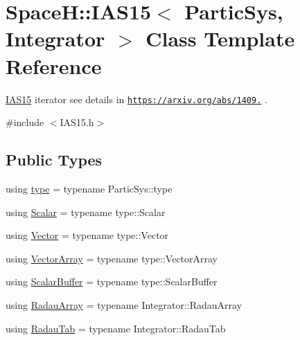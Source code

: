\hypertarget{class_space_h_1_1_i_a_s15}{}\section{SpaceH\+:\+:I\+A\+S15$<$ Partic\+Sys, Integrator $>$ Class Template Reference}
\label{class_space_h_1_1_i_a_s15}


\mbox{\hyperlink{class_space_h_1_1_i_a_s15}{I\+A\+S15}} iterator see details in \href{https://arxiv.org/abs/1409.4779}{\tt https\+://arxiv.\+org/abs/1409.} .  




{\ttfamily \#include $<$I\+A\+S15.\+h$>$}

\subsection*{Public Types}
\begin{DoxyCompactItemize}
\item 
using \mbox{\hyperlink{class_space_h_1_1_i_a_s15_aaa8ebb8060b4421b9bb799dfb0a0d21a}{type}} = typename Partic\+Sys\+::type
\item 
using \mbox{\hyperlink{class_space_h_1_1_i_a_s15_ac4ee5f40852d7b500ca50084eb35b012}{Scalar}} = typename type\+::\+Scalar
\item 
using \mbox{\hyperlink{class_space_h_1_1_i_a_s15_ae34d12477ecdc0742911fc95748e5fd8}{Vector}} = typename type\+::\+Vector
\item 
using \mbox{\hyperlink{class_space_h_1_1_i_a_s15_a70aa5a3879ee4da4472dbeca219f9b3f}{Vector\+Array}} = typename type\+::\+Vector\+Array
\item 
using \mbox{\hyperlink{class_space_h_1_1_i_a_s15_a17ef1472c0db7e9fdafffed41e5b9a3b}{Scalar\+Buffer}} = typename type\+::\+Scalar\+Buffer
\item 
using \mbox{\hyperlink{class_space_h_1_1_i_a_s15_a1eda622ee773ed5b2dff783600e1f7f7}{Radau\+Array}} = typename Integrator\+::\+Radau\+Array
\item 
using \mbox{\hyperlink{class_space_h_1_1_i_a_s15_a4023c69d2644098aa8d75181f6a82fc7}{Radau\+Tab}} = typename Integrator\+::\+Radau\+Tab
\end{DoxyCompactItemize}
